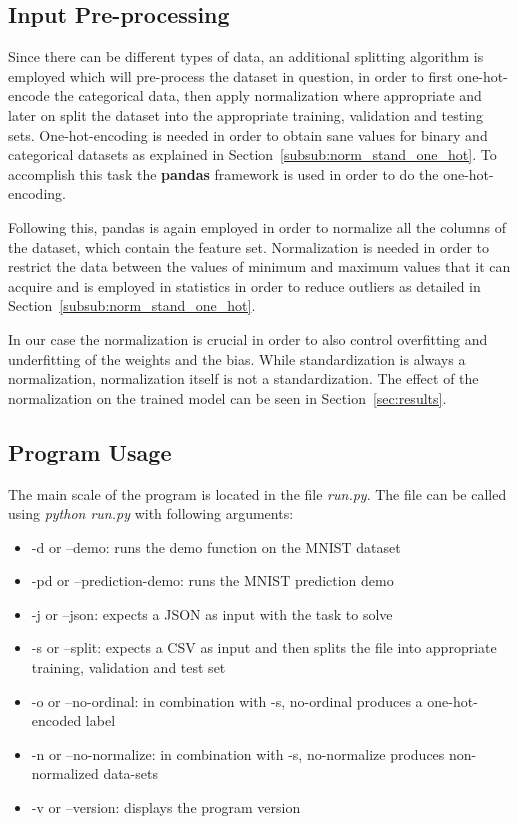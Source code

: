 \documentclass[12pt]{article}
\begin{document}
\subsection{Input Pre-processing}
\label{sub:splitfunc}

Since there can be different types of data, an additional splitting algorithm is employed which will pre-process the dataset in question, in order to first one-hot-encode the categorical data, then apply normalization where appropriate and later on split the dataset into the appropriate training, validation and testing sets. One-hot-encoding is needed in order to obtain sane values for binary and categorical datasets as explained in Section~\ref{subsub:norm_stand_one_hot}. To accomplish this task the \textbf{pandas} framework is used in order to do the one-hot-encoding. 

Following this, pandas is again employed in order to normalize all the columns of the dataset, which contain the feature set. Normalization is needed in order to restrict the data between the values of minimum and maximum values that it can acquire and is employed in statistics in order to reduce outliers as detailed in Section~\ref{subsub:norm_stand_one_hot}. 

In our case the normalization is crucial in order to also control overfitting and underfitting of the weights and the bias. While standardization is always a normalization, normalization itself is not a standardization. The effect of the normalization on the trained model can be seen in Section~\ref{sec:results}.

\subsection{Program Usage}
\label{sub:program}

The main scale of the program is located in the file \textit{run.py}. The file can be called using \textit{python run.py} with following arguments:
\begin{itemize}
    \item -d or --demo: runs the demo function on the MNIST dataset
    \item -pd or --prediction-demo: runs the MNIST prediction demo 
    \item -j or --json: expects a JSON as input with the task to solve
    \item -s or --split: expects a CSV as input and then splits the file into appropriate training, validation and test set
    \item -o or --no-ordinal: in combination with -s, no-ordinal produces a one-hot-encoded label
    \item -n or --no-normalize: in combination with -s, no-normalize produces non-normalized data-sets
    \item -v or --version: displays the program version
\end{itemize}
\end{document}
